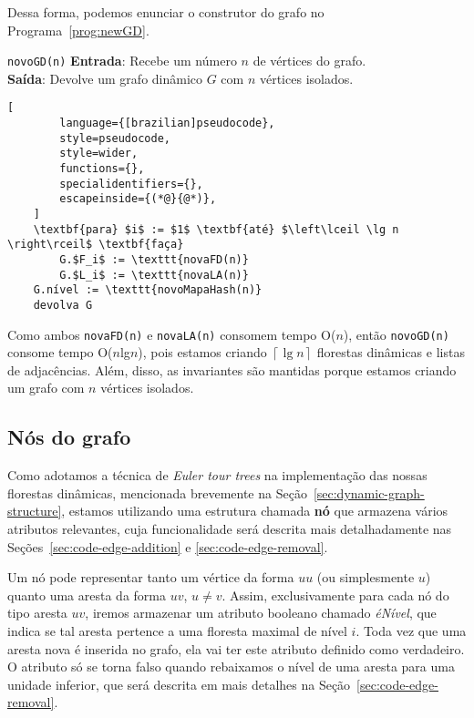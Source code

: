 Dessa forma, podemos enunciar o construtor do grafo no Programa~\ref{prog:newGD}. 

\begin{programruledcaption}{\texttt{novoGD(n)} \label{prog:newGD}}
    \noindent\textbf{Entrada}: Recebe um número $n$ de vértices do grafo. \\
    \textbf{Saída}: Devolve um grafo dinâmico $G$ com $n$ vértices isolados.
    \vspace{-0.5\baselineskip}
    \begin{lstlisting}[
        language={[brazilian]pseudocode},
        style=pseudocode,
        style=wider,
        functions={},
        specialidentifiers={},
        escapeinside={(*@}{@*)},
    ]
    \textbf{para} $i$ := $1$ \textbf{até} $\left\lceil \lg n \right\rceil$ \textbf{faça}
        G.$F_i$ := \texttt{novaFD(n)}
        G.$L_i$ := \texttt{novaLA(n)}
    G.nível := \texttt{novoMapaHash(n)}
    devolva G
    \end{lstlisting}
    \vspace{-0.5\baselineskip}
\end{programruledcaption}

Como ambos \texttt{novaFD(n)} e \texttt{novaLA(n)} consomem tempo O($n$), então \texttt{novoGD(n)} consome tempo O($n$lg$n$), pois estamos criando $\left\lceil \lg n \right\rceil$ florestas dinâmicas e listas de adjacências. Além, disso, as invariantes são mantidas porque estamos criando um grafo com $n$ vértices isolados.

\subsection{Nós do grafo}
\label{sec:graph-nodes}

Como adotamos a técnica de \textit{Euler tour trees} na implementação das nossas florestas dinâmicas, mencionada brevemente na Seção~\ref{sec:dynamic-graph-structure}, estamos utilizando uma estrutura chamada \textbf{nó} que armazena vários atributos relevantes, cuja funcionalidade será descrita mais detalhadamente nas Seções~\ref{sec:code-edge-addition} e \ref{sec:code-edge-removal}. 

Um nó pode representar tanto um vértice da forma $uu$ (ou simplesmente $u$) quanto uma aresta da forma $uv$, $u \neq v$. Assim, exclusivamente para cada nó do tipo aresta $uv$, iremos armazenar um atributo booleano chamado \textit{éNível}, que indica se tal aresta pertence a uma floresta maximal de nível $i$. Toda vez que uma aresta nova é inserida no grafo, ela vai ter este atributo definido como verdadeiro. O atributo só se torna falso quando rebaixamos o nível de uma aresta para uma unidade inferior, que será descrita em mais detalhes na Seção~\ref{sec:code-edge-removal}. 

